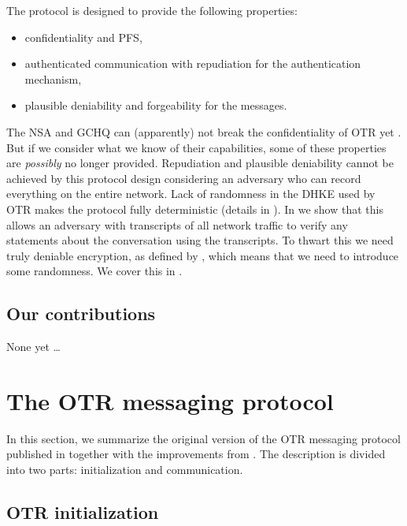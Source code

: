 The protocol is designed to provide the following properties:
\begin{itemize}
  \item confidentiality and \ac{PFS},
  \item authenticated communication with repudiation for the authentication 
    mechanism,
  \item plausible deniability and forgeability for the messages.
\end{itemize}
The \ac{NSA} and \ac{GCHQ} can (apparently) not break the confidentiality of 
\ac{OTR} yet \cite{spiegelotr}.
But if we consider what we know of their capabilities, some of these properties 
are \emph{possibly} no longer provided.
Repudiation and plausible deniability cannot be achieved by this protocol 
design considering an adversary who can record everything on the entire 
network.
Lack of randomness in the \ac{DHKE} \cite{dh} used by \ac{OTR} makes 
the protocol fully deterministic (details in ).
In  we show that this allows an adversary with 
transcripts of all network traffic to verify any statements about the 
conversation using the transcripts.
To thwart this we need truly deniable encryption, as defined by 
\citet{deniablecrypt}, which means that we need to introduce some randomness.
We cover this in .

\subsection{Our contributions}

None yet \dots


\section{The \acs{OTR} messaging protocol}
\label{sec:otr}

In this section, we summarize the original version of the \ac{OTR} messaging 
protocol published in \cite{otr2004} together with the improvements from 
\cite{di2005secure}.
The description is divided into two parts: initialization and communication.

\subsection{\acs{OTR} initialization}

